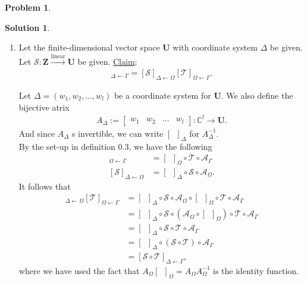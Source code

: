 \documentclass{article}
\theoremstyle{definition}
\newtheorem*{prob*}{Problem}
\newtheorem*{sln*}{Solution}
\newcommand{\Z}{\mathbf{Z}}
\newcommand{\U}{\mathbf{U}}
\newcommand{\lin}{\overset{\text{linear}}{\longrightarrow}}
\newcommand{\T}{\mathcal{T}}
\begin{document}
\begin{prob*}
\begin{sln*}
\begin{enumerate}
 			
 			
 			
 			\item Let the finite-dimensional vector space $\U$ with coordinate system $\Delta$ be given. Let $\mathcal{S}:\Z \lin \U$ be given. \underline{Claim}:
			\begin{align*}
 			[\mathcal{S} \circ \T]_{\Delta\leftarrow\Gamma} = [\mathcal{S}]_{\Delta\leftarrow\Omega}[\T]_{\Omega\leftarrow\Gamma}.
 			\end{align*}
 			
 			Let $\Delta = (w_1,w_2,\dots,w_l)$ be a coordinate system for $\U$. We also define the bijective atrix
 			\begin{align*}
 			A_\Delta := \begin{bmatrix}
 			w_1&w_2&\dots&w_l
 			\end{bmatrix} : \mathbb{C}^l \rightarrow \U.
 			\end{align*}
 			And since $A_\Delta$ s invertible, we can write $[\,\,\,]_\Delta$ for $A^{-1}_\Delta$. \\
 			
			By the set-up in definition 0.3, we have the following
			\begin{align*}
			[\T]_{\Omega\leftarrow \Gamma} &= [\,\,\,]_\Omega\circ \T\circ \mathcal{A}_\Gamma\\
			[\mathcal{S}]_{\Delta\leftarrow\Omega} &= [\,\,\,]_\Delta \circ \mathcal{S} \circ \mathcal{A}_\Omega.			
			\end{align*}
 			It follows that
 			\begin{align*}
 			[\mathcal{S}]_{\Delta \leftarrow \Omega}[\mathcal{T}]_{\Omega\leftarrow\Gamma}
			&= [\,\,\,]_\Delta \circ \mathcal{S} \circ \mathcal{A}_\Omega \circ [\,\,\,]_\Omega\circ \T\circ \mathcal{A}_\Gamma\\
			&= [\,\,\,]_\Delta \circ \mathcal{S} \circ \left( \mathcal{A}_\Omega \circ [\,\,\,]_\Omega \right) \circ \T\circ \mathcal{A}_\Gamma\\
			&= [\,\,\,]_\Delta \circ \mathcal{S} \circ \T\circ \mathcal{A}_\Gamma\\
			&= [\,\,\,]_\Delta \circ \left(\mathcal{S} \circ \T \right) \circ \mathcal{A}_\Gamma\\
			&= [\mathcal{S}\circ \T]_{\Delta \leftarrow \Gamma},
 			\end{align*}
			where we have used the fact that $A_\Omega [\,\,\,]_\Omega = A_\Omega A_\Omega^{-1}$ is the identity function. \\
			
			
			

\end{enumerate}
\end{sln*}
\end{prob*}
\end{document}
